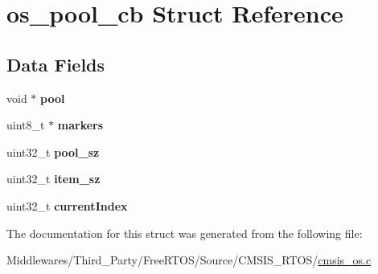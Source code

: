 \hypertarget{structos__pool__cb}{}\section{os\+\_\+pool\+\_\+cb Struct Reference}
\label{structos__pool__cb}
\subsection*{Data Fields}
\begin{DoxyCompactItemize}
\item 
\mbox{\label{structos__pool__cb_a269c3935f8bc66db70bccdd02cb05e3c}} 
void $\ast$ {\bfseries pool}
\item 
\mbox{\label{structos__pool__cb_aa7e8adca93ab05c505aed9ba64f3d051}} 
uint8\+\_\+t $\ast$ {\bfseries markers}
\item 
\mbox{\label{structos__pool__cb_ac112e786b2a234e0e45cb5bdbee53763}} 
uint32\+\_\+t {\bfseries pool\+\_\+sz}
\item 
\mbox{\label{structos__pool__cb_a4c2a0c691de3365c00ecd22d8102811f}} 
uint32\+\_\+t {\bfseries item\+\_\+sz}
\item 
\mbox{\label{structos__pool__cb_ab4b4b716d43052069903be4355ea9d9b}} 
uint32\+\_\+t {\bfseries current\+Index}
\end{DoxyCompactItemize}


The documentation for this struct was generated from the following file\+:\begin{DoxyCompactItemize}
\item 
Middlewares/\+Third\+\_\+\+Party/\+Free\+R\+T\+O\+S/\+Source/\+C\+M\+S\+I\+S\+\_\+\+R\+T\+O\+S/\mbox{\hyperlink{cmsis__os_8c}{cmsis\+\_\+os.\+c}}\end{DoxyCompactItemize}
